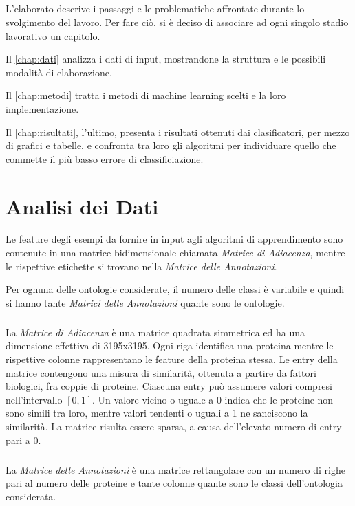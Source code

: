 \documentclass[12pt,a4paper,oneside,hidelinks]{report}
\begin{document}
\paragraph*{}
L'elaborato descrive i passaggi e le problematiche affrontate durante lo svolgimento del lavoro. Per fare ciò, si è deciso di associare ad ogni singolo stadio lavorativo un capitolo. 

Il \autoref{chap:dati} analizza i dati di input, mostrandone la struttura e le possibili modalità di elaborazione.

Il \autoref{chap:metodi} tratta i metodi di machine learning scelti e la loro implementazione. 

Il \autoref{chap:risultati}, l'ultimo, presenta i risultati ottenuti dai clasificatori, per mezzo di grafici e tabelle, e confronta tra loro gli algoritmi per individuare quello che commette il più basso errore di classificiazione.

\chapter{Analisi dei Dati} 
\label{chap:dati}
Le feature degli esempi da fornire in input agli algoritmi di apprendimento sono contenute in una matrice bidimensionale chiamata \textit{Matrice di Adiacenza}, mentre le rispettive etichette si trovano nella \textit{Matrice delle Annotazioni}.

Per ognuna delle ontologie considerate, il numero delle classi è variabile e quindi si hanno tante \textit{Matrici delle Annotazioni} quante sono le ontologie.

\paragraph*{}
La \textit{Matrice di Adiacenza} è una matrice quadrata simmetrica ed ha una dimensione effettiva di 3195x3195. Ogni riga identifica una proteina mentre le rispettive colonne rappresentano le feature della proteina stessa. Le entry della matrice contengono una misura di similarità, ottenuta a partire da fattori biologici, fra coppie di proteine.
Ciascuna entry può assumere valori compresi nell'intervallo $[0,1]$. Un valore vicino o uguale a 0 indica che le proteine non sono simili tra loro, mentre valori tendenti o uguali a 1 ne sanciscono la similarità. 
La matrice risulta essere sparsa, a causa dell'elevato numero di entry pari a 0.

\paragraph*{}
La \textit{Matrice delle Annotazioni} è una matrice rettangolare con un numero di righe pari al numero delle proteine e tante colonne quante sono le classi dell'ontologia considerata.
\end{document}
